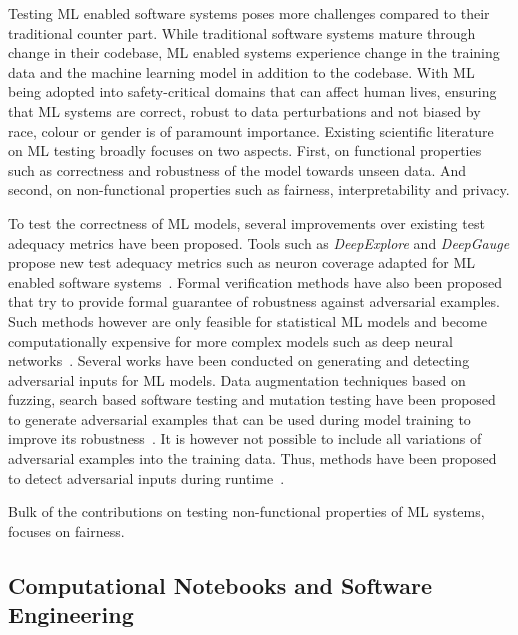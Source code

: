 \documentclass[conference]{IEEEtran}
\begin{document}
Testing ML enabled software systems poses more challenges compared to
their traditional counter part. While traditional software systems
mature through change in their codebase, ML enabled systems experience
change in the training data and the machine learning model in addition
to the codebase\cite{CITEME}. With ML being adopted into
safety-critical domains that can affect human lives, ensuring that ML
systems are correct, robust to data perturbations and not biased by
race, colour or gender is of paramount importance. Existing scientific
literature on ML testing broadly focuses on two aspects. First, on
functional properties such as correctness and robustness of the model
towards unseen data. And second, on non-functional properties such as
fairness, interpretability and privacy.

To test the correctness of ML models, several improvements over
existing test adequacy metrics have been proposed. Tools such as
\textit{DeepExplore} and \textit{DeepGauge} propose new test adequacy
metrics such as neuron coverage adapted for ML enabled software
systems~\cite{pei2017deepexplore, ma2018deepgauge,
gerasimou2020importance}. Formal verification methods have also been
proposed that try to provide formal guarantee of robustness against
adversarial examples. Such methods however are only feasible for
statistical ML models and become computationally expensive for more
complex models such as deep neural networks~\cite{zhu2021deepmemory,
baluta2021scalable}. Several works have been conducted on generating
and detecting adversarial inputs for ML models. Data augmentation
techniques based on fuzzing, search based software testing and
mutation testing have been proposed to generate adversarial examples
that can be used during model training to improve its
robustness~\cite{braiek2019deepevolution, gao2020fuzz, wang2021robot,
zhang2020white}. It is however not possible to include all variations
of adversarial examples into the training data. Thus, methods have
been proposed to detect adversarial inputs during
runtime~\cite{xiao2021self, wang2020dissector, wang2019adversarial,
berend2020cats}.

Bulk of the contributions on testing non-functional properties of ML
systems, focuses on fairness.

\subsection{Computational Notebooks and Software
  Engineering}\label{sec:notebooks}
\end{document}
